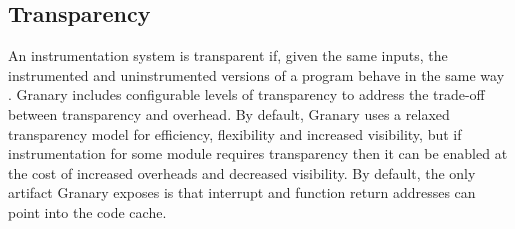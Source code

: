 \documentclass[preprint]{sigplanconf}
\begin{document}
\subsection{Transparency}\label{sec:transparency}
An instrumentation system is transparent if, given the same inputs, the instrumented and uninstrumented versions of a program behave in the same way \cite{Transparency}. Granary includes configurable levels of transparency to address the trade-off between transparency and overhead. By default, Granary uses a relaxed transparency \cite{btkernel} model for efficiency, flexibility and increased visibility, but if instrumentation for some module requires transparency then it can be enabled at the cost of increased overheads and decreased visibility. By default, the only artifact Granary exposes is that interrupt and function return addresses can point into the code cache.
\end{document}
